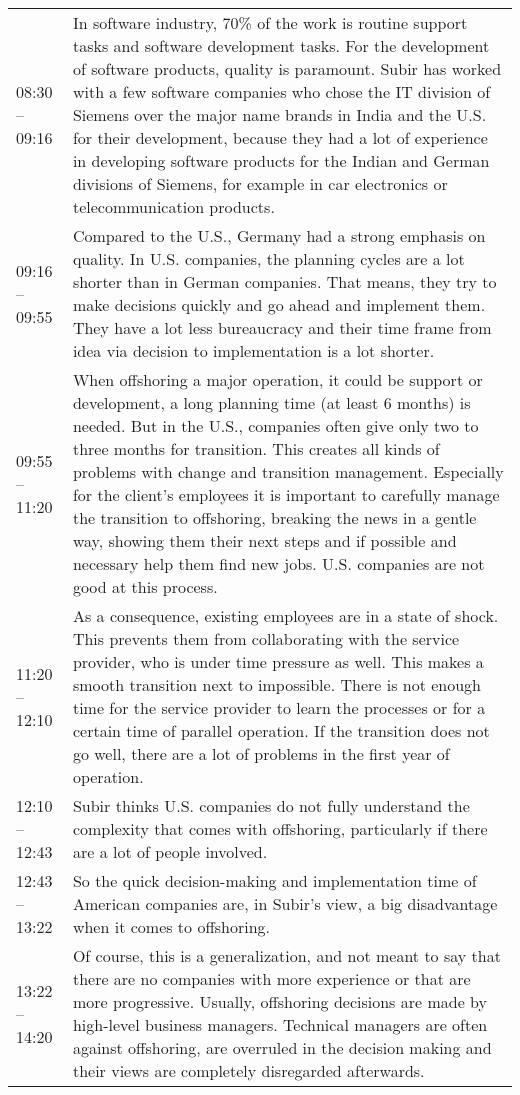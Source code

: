 \begin{appendix}
\begin{longtable}{l p{12.5cm}}
	08:30 -- 09:16&In software industry, 70\% of the work is routine support tasks and software development tasks. For the development of software products, quality is paramount. Subir has worked with a few software companies who chose the IT division of Siemens over the major name brands in India and the U.S. for their development, because they had a lot of experience in developing software products for the Indian and German divisions of Siemens, for example in car electronics or telecommunication products.\\
	09:16 -- 09:55&Compared to the U.S., Germany had a strong emphasis on quality. In U.S. companies, the planning cycles are a lot shorter than in German companies. That means, they try to make decisions quickly and go ahead and implement them. They have a lot less bureaucracy and their time frame from idea via decision to implementation is a lot shorter.\\
	09:55 -- 11:20&When offshoring a major operation, it could be support or development, a long planning time (at least 6 months) is needed. But in the U.S., companies often give only two to three months for transition. This creates all kinds of problems with change and transition management. Especially for the client's employees it is important to carefully manage the transition to offshoring, breaking the news in a gentle way, showing them their next steps and if possible and necessary help them find new jobs. U.S. companies are not good at this process.\\
	11:20 -- 12:10&As a consequence, existing employees are in a state of shock. This prevents them from collaborating with the service provider, who is under time pressure as well. This makes a smooth transition next to impossible. There is not enough time for the service provider to learn the processes or for a certain time of parallel operation. If the transition does not go well, there are a lot of problems in the first year of operation.\\
	12:10 -- 12:43&Subir thinks U.S. companies do not fully understand the complexity that comes with offshoring, particularly if there are a lot of people involved.\\
	12:43 -- 13:22& So the quick decision-making and implementation time of American companies are, in Subir's view, a big disadvantage when it comes to offshoring.\\
	13:22 -- 14:20&Of course, this is a generalization, and not meant to say that there are no companies with more experience or that are more progressive. Usually, offshoring decisions are made by high-level business managers. Technical managers are often against offshoring, are overruled in the decision making and their views are completely disregarded afterwards.\\

\end{longtable}
\end{appendix}
